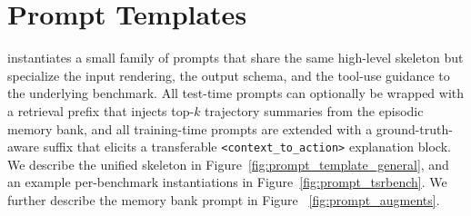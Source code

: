 \section{Prompt Templates}
\label{app:prompts}

\method instantiates a small family of prompts that share the same high-level
skeleton but specialize the input rendering, the output schema, and the
tool-use guidance to the underlying benchmark. All test-time prompts can
optionally be wrapped with a retrieval prefix that injects top-$k$ trajectory
summaries from the episodic memory bank, and all training-time prompts are
extended with a ground-truth-aware suffix that elicits a transferable
\texttt{<context\_to\_action>} explanation block. We describe the unified
skeleton in Figure~\ref{fig:prompt_template_general}, and an example per-benchmark
instantiations in Figure~\ref{fig:prompt_tsrbench}. We further describe the memory bank prompt in Figure ~\ref{fig:prompt_augments}.



\clearpage


